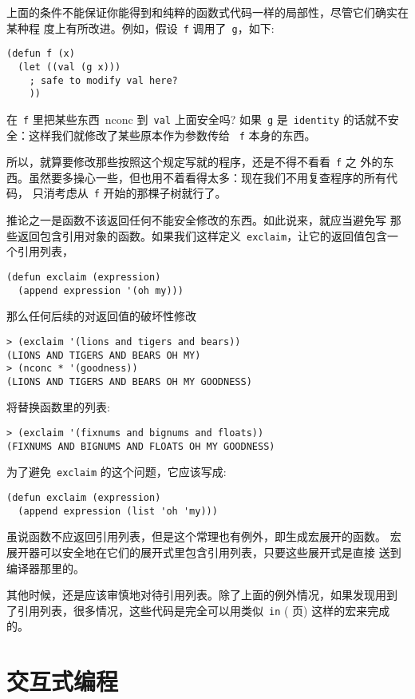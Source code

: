 上面的条件不能保证你能得到和纯粹的函数式代码一样的局部性，尽管它们确实在某种程
度上有所改进。例如，假设~\texttt{f} 调用了~\texttt{g}，如下:
\begin{lstlisting}
(defun f (x)
  (let ((val (g x)))
    ; safe to modify val here?
    ))
\end{lstlisting}
在~\texttt{f} 里把某些东西~nconc 到~\texttt{val} 上面安全吗? 如果~\texttt{g}
是~\texttt{identity} 的话就不安全：这样我们就修改了某些原本作为参数传给
~\texttt{f} 本身的东西。

所以，就算要修改那些按照这个规定写就的程序，还是不得不看看~\texttt{f} 之
外的东西。虽然要多操心一些，但也用不着看得太多：现在我们不用复查程序的所有代码，
只消考虑从~\texttt{f} 开始的那棵子树就行了。

推论之一是函数不该返回任何不能安全修改的东西。如此说来，就应当避免写
那些返回包含引用对象的函数。如果我们这样定义~\texttt{exclaim}，让它的返回值包含一个引用列表，

\begin{lstlisting}
(defun exclaim (expression)
  (append expression '(oh my)))
\end{lstlisting}
\label{fun:exclaim:error}
那么任何后续的对返回值的破坏性修改
\begin{lstlisting}
> (exclaim '(lions and tigers and bears))
(LIONS AND TIGERS AND BEARS OH MY)
> (nconc * '(goodness))
(LIONS AND TIGERS AND BEARS OH MY GOODNESS)
\end{lstlisting}
将替换函数里的列表:
\begin{lstlisting}
> (exclaim '(fixnums and bignums and floats))
(FIXNUMS AND BIGNUMS AND FLOATS OH MY GOODNESS)
\end{lstlisting}
为了避免~\texttt{exclaim} 的这个问题，它应该写成:
\begin{lstlisting}
(defun exclaim (expression)
  (append expression (list 'oh 'my)))
\end{lstlisting}

虽说函数不应返回引用列表，但是这个常理也有例外，即生成宏展开的函数。
宏展开器可以安全地在它们的展开式里包含引用列表，只要这些展开式是直接
送到编译器那里的。

其他时候，还是应该审慎地对待引用列表。除了上面的例外情况，如果发现用到
了引用列表，很多情况，这些代码是完全可以用类似~\texttt{in}
(\pageref{fig:macros_for_conditional_evaluation_2} 页) 这样的宏来完成
的。

\section{交互式编程}
\label{sec:interactive_programming}

